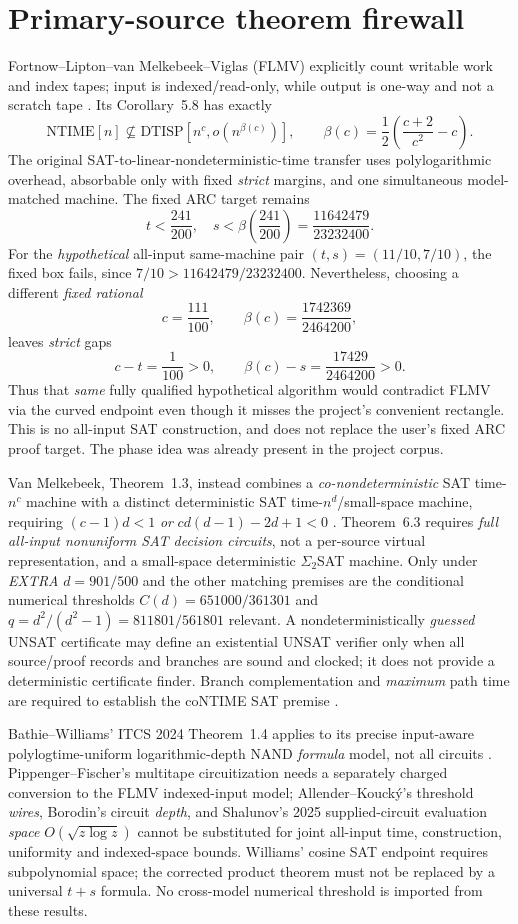 \documentclass[11pt]{article}
\begin{document}
\section{Primary-source theorem firewall}
Fortnow--Lipton--van Melkebeek--Viglas (FLMV) explicitly count writable work and index tapes; input is indexed/read-only, while output is one-way and not a scratch tape \cite{flmv}. Its Corollary~5.8 has exactly
\[
\mathrm{NTIME}[n]\not\subseteq\mathrm{DTISP}[n^c,o(n^{\beta(c)})],
\qquad
\beta(c)=\frac12\left(\frac{c+2}{c^2}-c\right).
\]
The original SAT-to-linear-nondeterministic-time transfer uses polylogarithmic overhead, absorbable only with fixed \emph{strict} margins, and one simultaneous model-matched machine. The fixed ARC target remains
\[
t<\frac{241}{200},\quad s<\beta\!\left(\frac{241}{200}\right)
 =\frac{11642479}{23232400}.
\]
For the \emph{hypothetical} all-input same-machine pair $(t,s)=(11/10,7/10)$, the fixed box fails, since $7/10>11642479/23232400$. Nevertheless, choosing a different \emph{fixed rational}
\[
c=\frac{111}{100},\qquad
\beta(c)=\frac{1742369}{2464200},
\]
leaves \emph{strict} gaps
\[
c-t=\frac1{100}>0,\qquad
\beta(c)-s=\frac{17429}{2464200}>0.
\]
Thus that \emph{same} fully qualified hypothetical algorithm would contradict FLMV via the curved endpoint even though it misses the project's convenient rectangle. This is no all-input SAT construction, and does not replace the user's fixed ARC proof target. The phase idea was already present in the project corpus.

Van Melkebeek, Theorem~1.3, instead combines a \emph{co-nondeterministic} SAT time-$n^c$ machine with a distinct deterministic SAT time-$n^d$/small-space machine, requiring $(c-1)d<1$ \emph{or} $cd(d-1)-2d+1<0$ \cite{vm}. Theorem~6.3 requires \emph{full all-input nonuniform SAT decision circuits}, not a per-source virtual representation, and a small-space deterministic $\Sigma_2$SAT machine. Only under \emph{EXTRA} $d=901/500$ and the other matching premises are the conditional numerical thresholds $C(d)=651000/361301$ and $q=d^2/(d^2-1)=811801/561801$ relevant. A nondeterministically \emph{guessed} UNSAT certificate may define an existential UNSAT verifier only when all source/proof records and branches are sound and clocked; it does not provide a deterministic certificate finder. Branch complementation and \emph{maximum} path time are required to establish the coNTIME SAT premise \cite{vm}.

Bathie--Williams' ITCS 2024 Theorem~1.4 applies to its precise input-aware polylogtime-uniform logarithmic-depth NAND \emph{formula} model, not all circuits \cite{bw}. Pippenger--Fischer's multitape circuitization needs a separately charged conversion to the FLMV indexed-input model; Allender--Kouck\'y's threshold \emph{wires}, Borodin's circuit \emph{depth}, and Shalunov's 2025 supplied-circuit evaluation \emph{space} $O(\sqrt{z\log z})$ cannot be substituted for joint all-input time, construction, uniformity and indexed-space bounds. Williams' cosine SAT endpoint requires subpolynomial space; the corrected product theorem must not be replaced by a universal $t+s$ formula. No cross-model numerical threshold is imported from these results.
\end{document}
